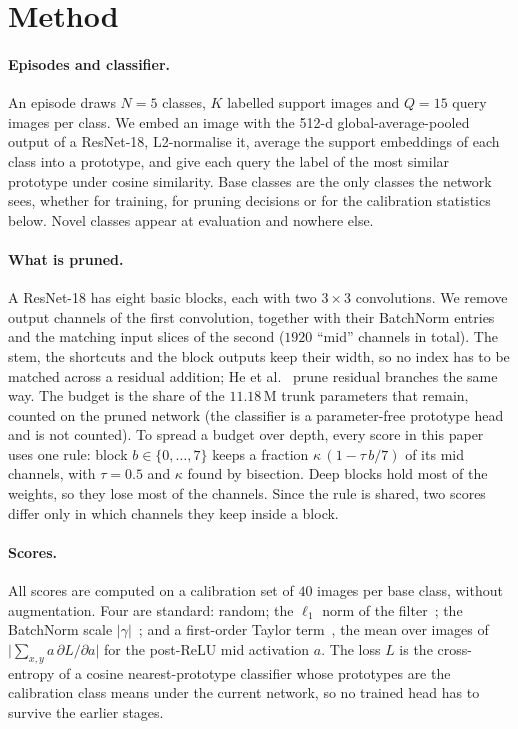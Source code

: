 \section{Method}
\label{sec:method}

\paragraph{Episodes and classifier.}
An episode draws $N{=}5$ classes, $K$ labelled support images and $Q{=}15$ query images per class. We embed an image with the 512-d global-average-pooled output of a ResNet-18, L2-normalise it, average the support embeddings of each class into a prototype, and give each query the label of the most similar prototype under cosine similarity. Base classes are the only classes the network sees, whether for training, for pruning decisions or for the calibration statistics below. Novel classes appear at evaluation and nowhere else.

\paragraph{What is pruned.}
A ResNet-18 has eight basic blocks, each with two $3{\times}3$ convolutions. We remove output channels of the first convolution, together with their BatchNorm entries and the matching input slices of the second ($1920$ ``mid'' channels in total). The stem, the shortcuts and the block outputs keep their width, so no index has to be matched across a residual addition; He et al.~\cite{he2017channel} prune residual branches the same way. The budget is the share of the $11.18$\,M trunk parameters that remain, counted on the pruned network (the classifier is a parameter-free prototype head and is not counted). To spread a budget over depth, every score in this paper uses one rule: block $b\in\{0,\dots,7\}$ keeps a fraction $\kappa\,(1-\tau\,b/7)$ of its mid channels, with $\tau{=}0.5$ and $\kappa$ found by bisection. Deep blocks hold most of the weights, so they lose most of the channels. Since the rule is shared, two scores differ only in which channels they keep inside a block.

\paragraph{Scores.}
All scores are computed on a calibration set of $40$ images per base class, without augmentation. Four are standard: random; the $\ell_1$ norm of the filter~\cite{li2017pruning}; the BatchNorm scale $|\gamma|$~\cite{liu2017slimming}; and a first-order Taylor term~\cite{molchanov2017pruning}, the mean over images of $\lvert\sum_{x,y} a\,\partial L/\partial a\rvert$ for the post-ReLU mid activation $a$. The loss $L$ is the cross-entropy of a cosine nearest-prototype classifier whose prototypes are the calibration class means under the current network, so no trained head has to survive the earlier stages.

